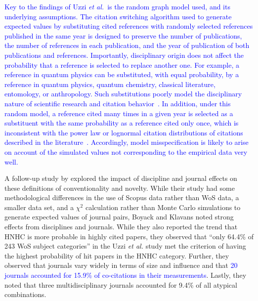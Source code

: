 \documentclass[NETN]{stjour}
\begin{document}
\textcolor{blue}{Key to the findings of Uzzi {\em et al.}~is the random graph model used, and its underlying assumptions. The citation switching algorithm used to generate expected values by substituting cited references with randomly selected references published in the same year is designed to preserve the number of publications, the number of references in each publication, and the year of publication of both publications and references. Importantly, disciplinary origin does not affect the probability that a reference is selected to replace another one. For example, a reference in quantum physics can be substituted, with equal probability, by a reference in quantum physics, quantum chemistry, classical literature, entomology, or anthropology. Such substitutions poorly model the disciplinary nature of scientific research and citation behavior~\citep{wallace_lariviere_gingras_2012,moed_measuring_2010,klavans_research_2017,garfield_1979}. In addition, under this random model, a reference cited many times in a given year is selected as a substituent with the same probability as a reference cited only once, which is inconsistent with the power law or lognormal citation distributions of citations described in the literature~\citep{stringer_statistical_2010,perline_strong_2005}.  Accordingly, model misspecification is likely to arise on account of the simulated values not corresponding to the empirical data very well.} 

A follow-up study by \cite{boyack_vs_uzzi_2014} explored the impact of discipline and journal effects on these definitions of conventionality and novelty.  While their study had some methodological differences in the use of Scopus data rather than WoS data, a smaller data set, and a $\chi^2$ calculation rather than Monte Carlo simulations to generate expected values of journal pairs, Boyack and Klavans noted strong effects from disciplines and journals. While they also reported the trend that HNHC is more probable in highly cited papers, they observed that ``only 64.4\%  of  243  WoS  subject  categories'' in the Uzzi {\em et al.} study met the criterion of having the highest probability of hit papers in the HNHC category.  Further, they observed that journals vary widely in terms of size and influence and that \textcolor{blue}{20 journals accounted for 15.9\% of co-citations in their measurements}. Lastly, they noted that three multidisciplinary journals accounted for 9.4\% of all atypical combinations. 
\end{document}
